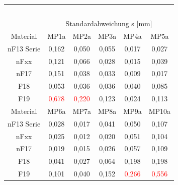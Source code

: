 \documentclass[12pt,a4paper,parskip]{scrartcl}
\begin{document}
\begin{table}[hbtp]
\begin{tabular}{cccccc}
     &&&&&\\
     &&&&&\\
     &&&&&\\
     &&&&&\\
     &&&&&\\
     
     \toprule
      & \multicolumn{5}{c}{Standardabweichung s [mm]}\\
   \cmidrule(ll){2-6}
   Material    & MP1a & MP2a & MP3a & MP4a & MP5a \\ 
   \midrule
    nF13 Serie&0,162&0,050&0,055&0,017&0,027\\
    nFxx &0,121&0,066&0,028&0,015&0,039\\
    nF17 &0,151&0,038&0,033&0,009&0,017\\
    F18 &0,053&0,036&0,036&0,040&0,085\\
    F19 &\textcolor{red}{0,678}&\textcolor{red}{0,220}&0,123&0,024&0,113\\
     \bottomrule
     
  Material    & MP6a & MP7a & MP8a & MP9a & MP10a  \\
  \midrule
    nF13 Serie &0,028&0,017&0,041&0,050&0,107\\
 nFxx   &0,025&0,012&0,020&0,051&0,104\\
nF17  &0,019&0,015&0,026&0,057&0,109\\ 
F18 &0,041&0,027&0,064&0,198&0,198\\
F19 &0,101&0,040&0,152&\textcolor{red}{0,266}&\textcolor{red}{0,556}\\
   \bottomrule 
         
   \end{tabular} 
\end{table}
\newpage
\end{document}
